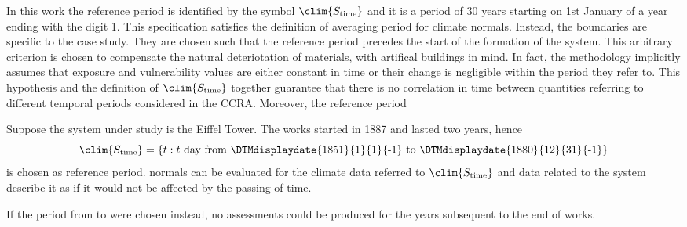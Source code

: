 In this work the reference period is identified by the symbol $\clim{S_\text{time}}$ and it is a period of 30 years starting on 1st January of a year ending with the digit 1. This specification satisfies the definition of averaging period for climate \glspl{normal}.
Instead, the boundaries are specific to the case study. They are chosen such that the reference period precedes the start of the formation of the system. This arbitrary criterion is chosen to compensate the natural deteriotation of materials, with artifical buildings in mind. In fact, the methodology implicitly assumes that exposure and vulnerability values are either constant in time or their change is negligible within the period they refer to. This hypothesis and the definition of $\clim{S_\text{time}}$ together guarantee that there is no correlation in time between quantities referring to different temporal periods considered in the \gls{CCRA}. Moreover, the reference period 
\begin{example}
  Suppose the system under study is the Eiffel Tower. The works started in 1887 and lasted two years, hence
  \begin{equation*}
    \clim{S_\text{time}} = \{ t : \text{$t$ day from \DTMdisplaydate{1851}{1}{1}{-1} to \DTMdisplaydate{1880}{12}{31}{-1}} \}
  \end{equation*}
  is chosen as reference period. \Glspl{normal} can be evaluated for the climate data referred to $\clim{S_\text{time}}$ and data related to the system describe it as if it would not be affected by the passing of time.
  
  If the period from  to  were chosen instead, no assessments could be produced for the years subsequent to the end of works.
\end{example}

